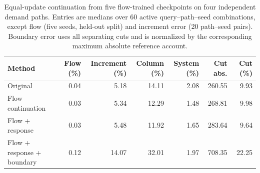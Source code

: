 \begin{table}[t]
\centering\small
\caption{Equal-update continuation from five flow-trained checkpoints on four independent demand paths. Entries are medians over 60 active query--path--seed combinations, except flow (five seeds, held-out split) and increment error (20 path--seed pairs). Boundary error uses all separating cuts and is normalized by the corresponding maximum absolute reference account.}
\label{tab:structured-learning}
\begin{tabular}{lrrrrrr}\toprule
Method & Flow (\%) & Increment (\%) & Column (\%) & System (\%) & Cut abs. & Cut (\%)\\\midrule
Original & 0.04 & 5.18 & 14.11 & 2.08 & 260.55 & 9.93\\
Flow continuation & 0.03 & 5.34 & 12.29 & 1.48 & 268.81 & 9.98\\
Flow + response & 0.03 & 5.48 & 11.92 & 1.65 & 283.64 & 9.64\\
Flow + response + boundary & 0.12 & 14.07 & 32.01 & 1.97 & 708.35 & 22.25\\
\bottomrule\end{tabular}
\end{table}
